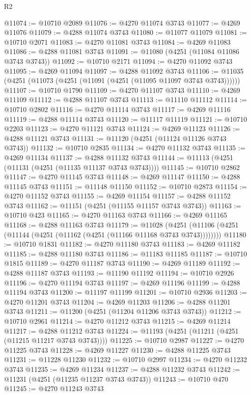 \begin{lexlean}{R2}
\begin{coremodule}
@11074 := @10710 @2089
@11076 := @4270 @11074 @3743
@11077 := @4269 @11076
@11079 := @4288 @11074 @3743
@11080 := @11077 @11079
@11081 := @10710 @2071
@11083 := @4270 @11081 @3743
@11084 := @4269 @11083
@11086 := @4288 @11081 @3743
@11091 := @11080 (@4251 (@11084 @11086 @3743 @3743))
@11092 := @10710 @2171
@11094 := @4270 @11092 @3743
@11095 := @4269 @11094
@11097 := @4288 @11092 @3743
@11106 := @11035 (@4251 (@11073 (@4251 (@11091 (@4251 (@11095 @11097 @3743 @3743))))))
@11107 := @10710 @1790
@11109 := @4270 @11107 @3743
@11110 := @4269 @11109
@11112 := @4288 @11107 @3743
@11113 := @11110 @11112
@11114 := @10710 @2802
@11116 := @4270 @11114 @3743
@11117 := @4269 @11116
@11119 := @4288 @11114 @3743
@11120 := @11117 @11119
@11121 := @10710 @2203
@11123 := @4270 @11121 @3743
@11124 := @4269 @11123
@11126 := @4288 @11121 @3743
@11131 := @11120 (@4251 (@11124 @11126 @3743 @3743))
@11132 := @10710 @2835
@11134 := @4270 @11132 @3743
@11135 := @4269 @11134
@11137 := @4288 @11132 @3743
@11144 := @11113 (@4251 (@11131 (@4251 (@11135 @11137 @3743 @3743))))
@11145 := @10710 @2862
@11147 := @4270 @11145 @3743
@11148 := @4269 @11147
@11150 := @4288 @11145 @3743
@11151 := @11148 @11150
@11152 := @10710 @2873
@11154 := @4270 @11152 @3743
@11155 := @4269 @11154
@11157 := @4288 @11152 @3743
@11162 := @11151 (@4251 (@11155 @11157 @3743 @3743))
@11163 := @10710 @423
@11165 := @4270 @11163 @3743
@11166 := @4269 @11165
@11168 := @4288 @11163 @3743
@11179 := @11028
    (@4251 (@11106 (@4251 (@11144 (@4251 (@11162 (@4251 (@11166 @11168 @3743 @3743))))))))
@11180 := @10710 @1831
@11182 := @4270 @11180 @3743
@11183 := @4269 @11182
@11185 := @4288 @11180 @3743
@11186 := @11183 @11185
@11187 := @10710 @1815
@11189 := @4270 @11187 @3743
@11190 := @4269 @11189
@11192 := @4288 @11187 @3743
@11193 := @11190 @11192
@11194 := @10710 @2926
@11196 := @4270 @11194 @3743
@11197 := @4269 @11196
@11199 := @4288 @11194 @3743
@11200 := @11197 @11199
@11201 := @10710 @2936
@11203 := @4270 @11201 @3743
@11204 := @4269 @11203
@11206 := @4288 @11201 @3743
@11211 := @11200 (@4251 (@11204 @11206 @3743 @3743))
@11212 := @10710 @2961
@11214 := @4270 @11212 @3743
@11215 := @4269 @11214
@11217 := @4288 @11212 @3743
@11224 := @11193 (@4251 (@11211 (@4251 (@11215 @11217 @3743 @3743))))
@11225 := @10710 @2987
@11227 := @4270 @11225 @3743
@11228 := @4269 @11227
@11230 := @4288 @11225 @3743
@11231 := @11228 @11230
@11232 := @10710 @2997
@11234 := @4270 @11232 @3743
@11235 := @4269 @11234
@11237 := @4288 @11232 @3743
@11242 := @11231 (@4251 (@11235 @11237 @3743 @3743))
@11243 := @10710 @470
@11245 := @4270 @11243 @3743

\end{coremodule}
\end{lexlean}
